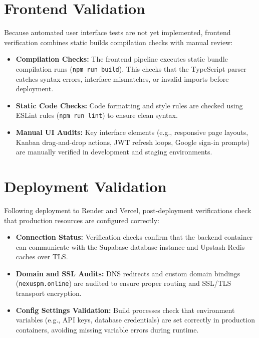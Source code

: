 \section{Frontend Validation}
Because automated user interface tests are not yet implemented, frontend verification combines static builds compilation checks with manual review:
\begin{itemize}
    \item \textbf{Compilation Checks:} The frontend pipeline executes static bundle compilation runs (\texttt{npm run build}). This checks that the TypeScript parser catches syntax errors, interface mismatches, or invalid imports before deployment.
    \item \textbf{Static Code Checks:} Code formatting and style rules are checked using ESLint rules (\texttt{npm run lint}) to ensure clean syntax.
    \item \textbf{Manual UI Audits:} Key interface elements (e.g., responsive page layouts, Kanban drag-and-drop actions, JWT refresh loops, Google sign-in prompts) are manually verified in development and staging environments.
\end{itemize}

\section{Deployment Validation}
Following deployment to Render and Vercel, post-deployment verifications check that production resources are configured correctly:
\begin{itemize}
    \item \textbf{Connection Status:} Verification checks confirm that the backend container can communicate with the Supabase database instance and Upstash Redis caches over TLS.
    \item \textbf{Domain and SSL Audits:} DNS redirects and custom domain bindings (\texttt{nexuspm.online}) are audited to ensure proper routing and SSL/TLS transport encryption.
    \item \textbf{Config Settings Validation:} Build processes check that environment variables (e.g., API keys, database credentials) are set correctly in production containers, avoiding missing variable errors during runtime.
\end{itemize}

